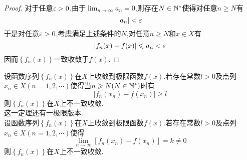 \documentclass{ctexart}
\begin{document}
\begin{proof}
    对于任意$\varepsilon>0$,由于$\displaystyle\lim_{n\to\infty}a_n=0$,则存在$N\in\mathbb{N}^*$使得对任意$n\geqslant N$有
    \[\left|a_n\right|<\varepsilon\]
    于是对任意$\varepsilon>0$,考虑满足上述条件的$N$,对任意$n\geqslant N$和$x\in X$有
    \[\left|f_n(x)-f(x)\right|\leqslant a_n<\varepsilon\]
    因而$\left\{f_n\left(x\right)\right\}$一致收敛于$f(x)$.
\end{proof}
\begin{formal}[2.4 不一致收敛的判据I]
    设函数序列$\left\{f_n(x)\right\}$在$X$上收敛到极限函数$f(x)$.若存在常数$l>0$及点列$x_n\in X(n=1,2,\cdots)$使得当$n\geqslant N(N\in\mathbb{N}^*)$时有
    \[\left|f_n(x_n)-f(x_n)\right|\geqslant l\]
    则$\left\{f_n(x)\right\}$在$X$上不一致收敛.\\
    这一定理还有一极限版本.\\
    设函数序列$\left\{f_n(x)\right\}$在$X$上收敛到极限函数$f(x)$.若存在常数$l>0$及点列$x_n\in X(n=1,2,\cdots)$使得
    \[\lim_{n\to\infty}\left[f_n(x_n)-f(x_n)\right]=k\neq0\]
    则$\left\{f_n(x)\right\}$在$X$上不一致收敛.
\end{formal}
\end{document}
